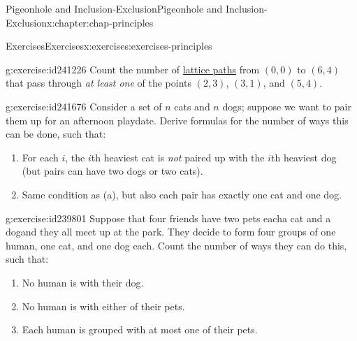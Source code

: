\documentclass[oneside,10pt,]{book}
\numberwithin{equation}{section}
\begin{document}
\begin{chapterptx}{Pigeonhole and Inclusion-Exclusion}{}{Pigeonhole and Inclusion-Exclusion}{}{}{x:chapter:chap-principles}
\begin{exercises-section}{Exercises}{}{Exercises}{}{}{x:exercises:exercises-principles}
\begin{divisionexercise}{14}{}{}{g:exercise:id241226}%
Count the number of \hyperref[x:example:eg-counting-lattice-path]{lattice paths} from \((0,0)\) to \((6,4)\) that pass through \emph{at least one} of the points \((2,3)\), \((3,1)\), and \((5,4)\).%
\begin{sidebyside}{1}{0.3}{0.3}{0}%
\begin{sbspanel}{0.4}%
%
\end{sbspanel}%
\end{sidebyside}%
\end{divisionexercise}%
\begin{divisionexercise}{15}{}{}{g:exercise:id241676}%
Consider a set of \(n\) cats and \(n\) dogs; suppose we want to pair them up for an afternoon playdate. Derive formulas for the number of ways this can be done, such that:%
\begin{enumerate}[label=(\alph*)]
\item{}For each \(i\), the \(i\)th heaviest cat is \emph{not} paired up with the \(i\)th heaviest dog (but pairs can have two dogs or two cats).%
\item{}Same condition as (a), but also each pair has exactly one cat and one dog.%
\end{enumerate}
%
\end{divisionexercise}%
\begin{divisionexercise}{16}{}{}{g:exercise:id239801}%
Suppose that four friends have two pets each\textemdash{}a cat and a dog\textemdash{}and they all meet up at the park. They decide to form four groups of one human, one cat, and one dog each. Count the number of ways they can do this, such that:%
\begin{enumerate}[label=(\alph*)]
\item{}No human is with their dog.%
\item{}No human is with either of their pets.%
\item{}Each human is grouped with at most one of their pets.%
\end{enumerate}
%
\end{divisionexercise}%
\end{exercises-section}
\end{chapterptx}
\end{document}
